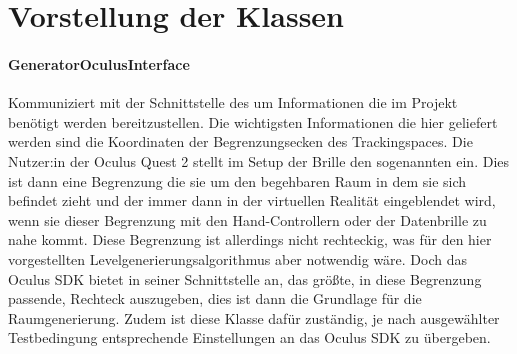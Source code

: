 \section{Vorstellung der Klassen}
\begin{multicols*}{2}
    \paragraph{GeneratorOculusInterface}
    Kommuniziert mit der Schnittstelle des  um Informationen die im Projekt benötigt werden bereitzustellen. Die wichtigsten Informationen die hier geliefert werden sind die Koordinaten der Begrenzungsecken des Trackingspaces. Die Nutzer:in der Oculus Quest 2 stellt im Setup der Brille den sogenannten  ein. Dies ist dann eine Begrenzung die sie um den begehbaren Raum in dem sie sich befindet zieht und der immer dann in der virtuellen Realität eingeblendet wird, wenn sie dieser Begrenzung mit den Hand-Controllern oder der Datenbrille zu nahe kommt. Diese Begrenzung ist allerdings nicht rechteckig, was für den hier vorgestellten Levelgenerierungsalgorithmus aber notwendig wäre. Doch das Oculus SDK bietet in seiner Schnittstelle an, das größte, in diese Begrenzung passende, Rechteck auszugeben, dies ist dann die Grundlage für die Raumgenerierung. Zudem ist diese Klasse dafür zuständig, je nach ausgewählter Testbedingung entsprechende Einstellungen an das Oculus SDK zu übergeben.


\end{multicols*}
